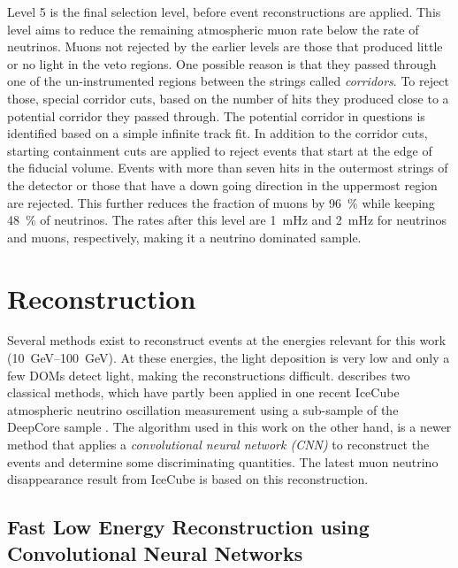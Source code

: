 Level 5 is the final selection level, before event reconstructions are applied. This level aims to reduce the remaining atmospheric muon rate below the rate of neutrinos. Muons not rejected by the earlier levels are those that produced little or no light in the veto regions. One possible reason is that they passed through one of the un-instrumented regions between the strings  called \textit{corridors}. To reject those, special corridor cuts, based on the number of hits they produced close to a potential corridor they passed through. The potential corridor in questions is identified based on a simple infinite track fit. In addition to the corridor cuts, starting containment cuts are applied to reject events that start at the edge of the fiducial volume. Events with more than seven hits in the outermost strings of the detector or those that have a down going direction in the uppermost region are rejected. This further reduces the fraction of muons by \SI{96}{\percent} while keeping \SI{48}{\percent} of neutrinos. The rates after this level are \SI{1}{\milli\hertz} and \SI{2}{\milli\hertz} for neutrinos and muons, respectively, making it a neutrino dominated sample.



\section{Reconstruction} 

Several methods exist to reconstruct events at the energies relevant for this work (\SIrange{10}{100}{\giga\electronvolt}). At these energies, the light deposition is very low and only a few DOMs detect light, making the reconstructions difficult.  describes two classical methods, which have partly been applied in one recent IceCube atmospheric neutrino oscillation measurement using a
sub-sample of the DeepCore sample . The algorithm used in this work on the other hand, is a newer method that applies a \textit{convolutional neural network (CNN)} to reconstruct the events and determine some discriminating quantities. The latest muon neutrino disappearance result from IceCube  is based on this reconstruction.


\subsection{Fast Low Energy Reconstruction using Convolutional Neural Networks} 

